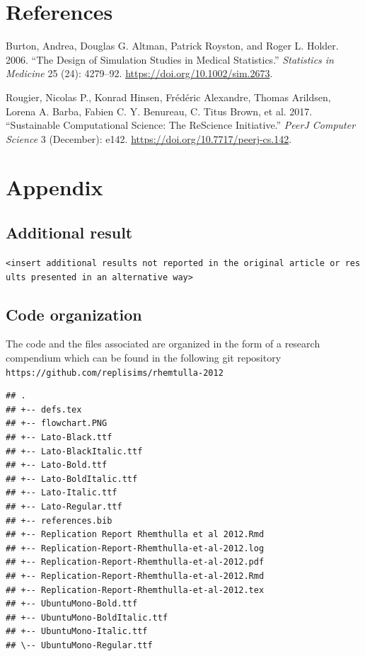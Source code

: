 \documentclass[10,a4paperpaper,]{article}
\newenvironment{CSLReferences}%
  {}%
  {\par}
\begin{document}
\newpage

\section*{References}
\begingroup
\hphantom{x}
\setlength{\parindent}{-0.5in}
\setlength{\leftskip}{0.5in}

\hypertarget{refs}{}
\begin{CSLReferences}{1}{0}
\leavevmode{}%
Burton, Andrea, Douglas G. Altman, Patrick Royston, and Roger L. Holder.
2006. {``The Design of Simulation Studies in Medical Statistics.''}
\emph{Statistics in Medicine} 25 (24): 4279--92.
\url{https://doi.org/10.1002/sim.2673}.

\leavevmode{}%
Rougier, Nicolas P., Konrad Hinsen, Frédéric Alexandre, Thomas Arildsen,
Lorena A. Barba, Fabien C. Y. Benureau, C. Titus Brown, et al. 2017.
{``Sustainable Computational Science: The {ReScience} Initiative.''}
\emph{PeerJ Computer Science} 3 (December): e142.
\url{https://doi.org/10.7717/peerj-cs.142}.

\end{CSLReferences}

\FloatBarrier
\endgroup
\newpage

\section*{Appendix}

\subsection*{Additional result}

\texttt{\textless{}insert\ additional\ results\ not\ reported\ in\ the\ original\ article\ or\ results\ presented\ in\ an\ alternative\ way\textgreater{}}

\subsection{Code organization}

The code and the files associated are organized in the form of a
research compendium which can be found in the following git repository
\texttt{https://github.com/replisims/rhemtulla-2012}

\begin{verbatim}
## .
## +-- defs.tex
## +-- flowchart.PNG
## +-- Lato-Black.ttf
## +-- Lato-BlackItalic.ttf
## +-- Lato-Bold.ttf
## +-- Lato-BoldItalic.ttf
## +-- Lato-Italic.ttf
## +-- Lato-Regular.ttf
## +-- references.bib
## +-- Replication Report Rhemthulla et al 2012.Rmd
## +-- Replication-Report-Rhemthulla-et-al-2012.log
## +-- Replication-Report-Rhemthulla-et-al-2012.pdf
## +-- Replication-Report-Rhemthulla-et-al-2012.Rmd
## +-- Replication-Report-Rhemthulla-et-al-2012.tex
## +-- UbuntuMono-Bold.ttf
## +-- UbuntuMono-BoldItalic.ttf
## +-- UbuntuMono-Italic.ttf
## \-- UbuntuMono-Regular.ttf
\end{verbatim}
\end{document}

